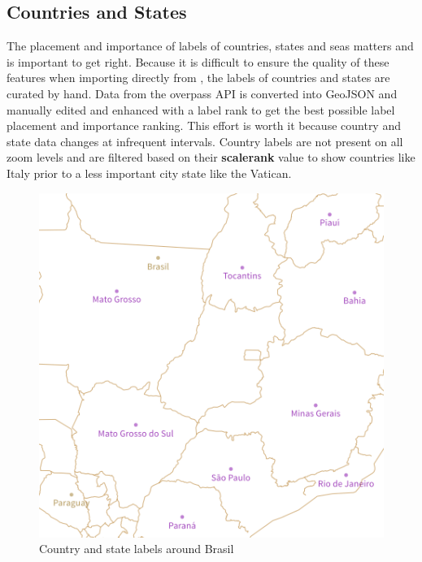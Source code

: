 \subsection{Countries and States}

\noindent\begin{minipage}[t]{0.48\linewidth}
    \vspace{0pt}
    The placement and importance of labels of countries, states and seas matters\cite{12_axismaps.github.io_2015} and is important to get right. 
    Because it is difficult to ensure the quality of these features when importing directly from \osm{}, the labels of countries and states are curated by hand.
    Data from the overpass API \cite{13_wiki.openstreetmap.org_2015} is converted into GeoJSON and manually edited and enhanced with a label rank to get the best possible label placement and importance ranking.
    This effort is worth it because country and state data changes
    at infrequent intervals.
    Country labels are not present on all zoom levels and are filtered based
    on their \textbf{scalerank} value to show countries like Italy prior to a less important city state like the Vatican.
\end{minipage}
\hfill
\begin{minipage}[t]{0.48\linewidth}
    \vspace{0pt}
    \begin{figure}[H]
        \includegraphics[width=\textwidth]{images/schema/country_state_label_example}
        \caption{Country and state labels around Brasil}
    \end{figure}
\end{minipage}

